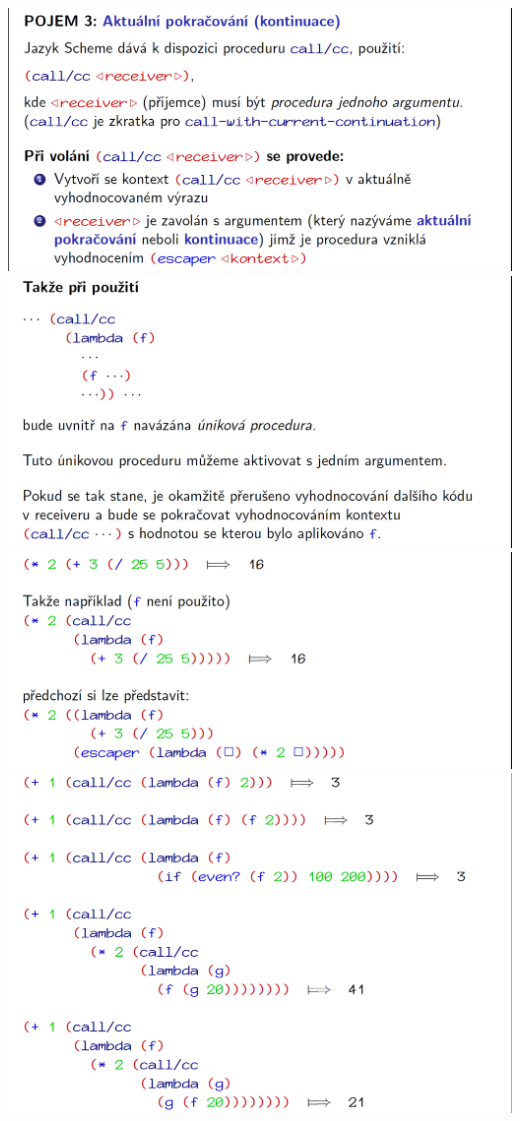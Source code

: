 \documentclass[10pt,a4paper]{article}
\begin{document}
\begin{center}
	\includegraphics[scale=0.35]{img/aktualni_pokracovani_8}
	\includegraphics[scale=0.35]{img/aktualni_pokracovani_9}
	\includegraphics[scale=0.35]{img/aktualni_pokracovani_10}
	\includegraphics[scale=0.31]{img/aktualni_pokracovani_11}

\end{center}
\end{document}
